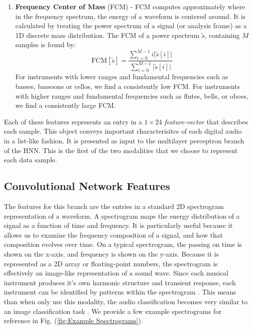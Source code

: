 \documentclass[conference,onecolumn,letterpaper]{IEEEtran}
\begin{document}
\begin{enumerate}
\item\textbf{Frequency Center of Mass} (FCM) - 
FCM computes approximately where in the frequency spectrum, the energy of a waveform is centered around. It is calculated by treating the power spectrum of a signal (or analysis frame) as a 1D discrete mass distribution. The FCM of a power spectrum $\widetilde{s}$, containing $M$ samples is found by:
\begin{equation}
    \label{eqn:FCM}
    \text{FCM}[\widetilde{s}] = 
    \frac{\sum_{i=0}^{M-1}i\big|\widetilde{s}[i]\big|}
    {\sum_{i=0}^{M-1}\big|\widetilde{s}[i]\big|}
\end{equation}
For instruments with lower ranges and fundamental frequencies such as basses, bassoons or cellos, we find a consistently low FCM. For instruments with higher ranges and fundamental frequencies such as flutes, bells, or oboes, we find a consistently large FCM.

\end{enumerate}

Each of these features represents an entry in a $1 \times 24$ \textit{feature-vector} that describes each sample. This object conveys important characterisitcs of each digital audio in a list-like fashion. It is presented as input to the multilayer perceptron branch of the HNN. This is the first of the two modalities that we choose to represent each data sample.


\subsection{Convolutional Network Features}
\label{subsec:FeaturesCNN}

The features for this branch are the entries in a standard 2D spectrogram representation of a waveform. A spectrogram maps the energy distribution of a signal as a function of time and frequency. It is particularly useful because it allows us to examine the frequency composition of a signal, and how that composition evolves over time. On a typical spectrogram, the passing on time is shown on the x-axis, and frequency is shown on the y-axis. Because it is represented as a 2D array or floating-point numbers, the spectrogram is effectively an image-like representation of a sound wave. Since each musical instrument produces it's own harmonic structure and transient response, each instrument can be identified by patterns within the spectrogram \cite{Virtanen}. This means than when only use this modality, the audio classification becomes very similar to an image classification task \cite{Ngiam}. We provide a few example spectrograms for reference in Fig. (\ref{fig:Example Spectrograms}).
\end{document}
